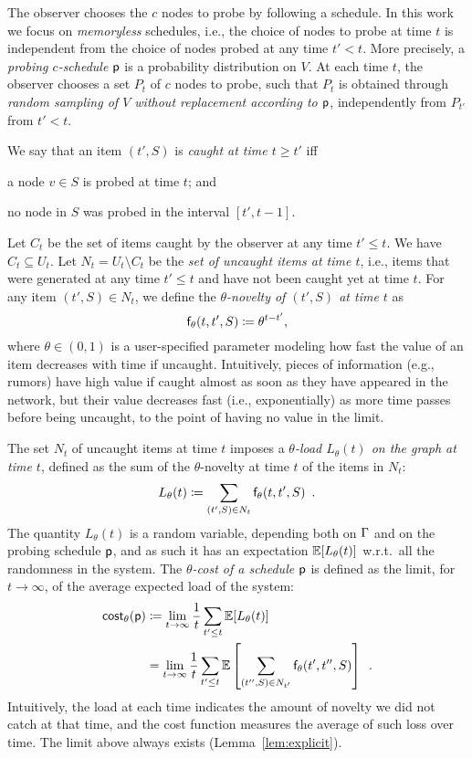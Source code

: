 The observer chooses the $c$ nodes to probe by following a schedule. In this work
we focus on \emph{memoryless} schedules, i.e., the choice of nodes to probe at
time $t$ is independent from the choice of nodes probed at any time $t'<t$.
More precisely, a \emph{probing $c$-schedule} $\mathsf{p}$ is a probability
distribution on $V$. At each time $t$, the observer chooses a set $P_t$ of $c$
nodes to probe, such that $P_t$ is obtained through \emph{random sampling of $V$
without replacement according to $\mathsf{p}$}, independently from $P_{t'}$ from
$t'< t$. 

We say that an item $(t',S)$ is \emph{caught at time $t\ge t'$} iff
\begin{enumerate*}
	\item a node $v\in S$ is probed at time $t$; and
	\item no node in $S$ was probed in the interval $[t',t-1]$.
\end{enumerate*}

Let $C_t$ be the set of items caught by the observer at any time $t'\le t$. We
have $C_t\subseteq U_t$. Let $N_t= U_t\setminus C_t$ be the \emph{set of
uncaught items at time $t$}, i.e., items that were generated at any time
$t'\le t$ and have not been caught yet at time $t$. For any item $(t',S)\in
N_t$, we define the \emph{$\theta$-novelty of $(t',S)$ at time $t$} as
\[
	\mathsf{f}_\theta(t,t',S)\coloneqq\theta^{t-t'},
\]
where $\theta\in(0,1)$ is a user-specified parameter modeling how fast the
value of an item decreases with time if uncaught. Intuitively, pieces of
information (e.g., rumors) have high value if caught almost as soon as they have
appeared in the network, but their value decreases fast (i.e., exponentially) as
more time passes before being uncaught, to the point of having no value in the
limit.

 The set $N_t$ of uncaught items
at time $t$ imposes a \emph{$\theta$-load $L_\theta(t)$ on the graph at time
$t$}, defined as the sum of the $\theta$-novelty at time $t$ of the items in
$N_t$:
\[
	L_\theta(t)\coloneqq\sum_{(t',S)\in N_t} \mathsf{f}_\theta(t,t',S)\enspace.
\]
The quantity $L_\theta(t)$ is a random variable, depending both on $\Gamma$ and on
the probing schedule $\mathsf{p}$, and as such it has an expectation
$\mathbb{E}[L_\theta(t)]$ w.r.t.~all the randomness in the system. The
\emph{$\theta$-cost of a schedule $\mathsf{p}$} is defined as the limit, for
$t\rightarrow\infty$, of the average expected load of the system:
\begin{align*}
	\mathsf{cost}_\theta(\mathsf{p})&\coloneqq\lim_{t\rightarrow\infty}\frac{1}{t}\sum_{t'\le
	t}\mathbb{E}[L_\theta(t)]\\
	&=\lim_{t\rightarrow\infty}\frac{1}{t}\sum_{t'\le
	t}\mathbb{E}\left[\sum_{(t'',S)\in N_{t'}}\mathsf{f}_\theta(t',t'',S)\right]\enspace.
\end{align*}
Intuitively, the load at each time indicates the amount of novelty we did not
catch at that time, and the cost function measures the average of such loss over
time. The limit above always exists (Lemma~\ref{lem:explicit}).


